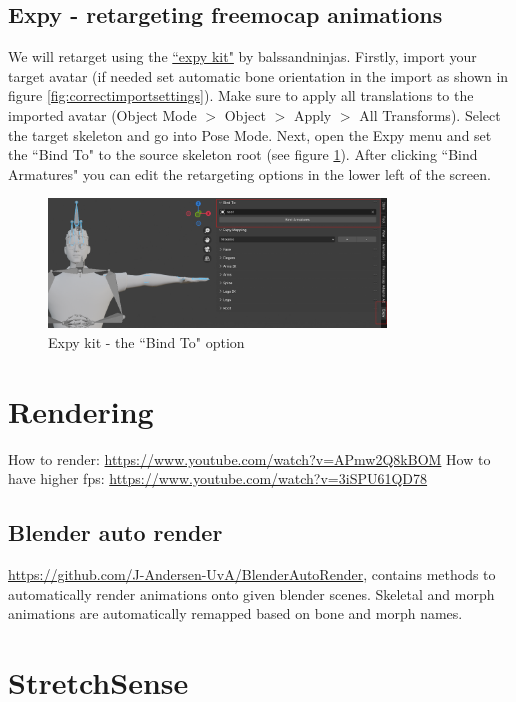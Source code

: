 \documentclass{uva-inf-article}
\begin{document}
\subsection{Expy - retargeting freemocap animations}
We will retarget using the \href{https://ballsandninjas.gumroad.com/l/xotibs}{``expy kit"} by balssandninjas. Firstly, import your target avatar (if needed set automatic bone orientation in the import as shown in figure \ref{fig:correctimportsettings}). Make sure to apply all translations to the imported avatar (Object Mode $>$ Object $>$ Apply $>$ All Transforms). Select the target skeleton and go into Pose Mode. Next, open the Expy menu and set the ``Bind To" to the source skeleton root (see figure \ref{fig:retargetexpy}).
After clicking ``Bind Armatures" you can edit the retargeting options in the lower left of the screen.
\begin{figure}[hbt!]
    \centering
    \includegraphics[width=0.8\textwidth]{imgs/retargetExpy.png}
    \caption{Expy kit - the ``Bind To" option}
    \label{fig:retargetexpy}
\end{figure}

\section{Rendering}
How to render:
\url{https://www.youtube.com/watch?v=APmw2Q8kBOM}
How to have higher fps:
\url{https://www.youtube.com/watch?v=3iSPU61QD78}

\subsection{Blender auto render}
\url{https://github.com/J-Andersen-UvA/BlenderAutoRender}, contains methods to automatically render animations onto given blender scenes. Skeletal and morph animations are automatically remapped based on bone and morph names.


\section{StretchSense}\label{section:stretchsense}
\end{document}
